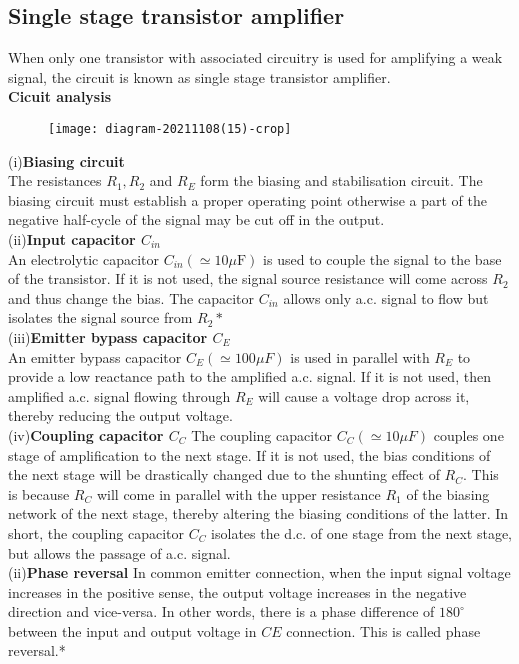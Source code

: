 \subsection{Single stage transistor amplifier}
When only one transistor with associated circuitry is used for amplifying a weak signal, the circuit is known as single stage transistor amplifier.\\
\textbf{Cicuit analysis}\\
\begin{figure}[H]
	\centering
	\texttt{[image: diagram-20211108(15)-crop]}
	\caption{}
	\label{}
\end{figure}
(i)\textbf{Biasing circuit}\\
The resistances $R_{1}, R_{2}$ and $R_{E}$ form the biasing and stabilisation circuit. The biasing circuit must establish a proper operating point otherwise a part of the negative half-cycle of the signal may be cut off in the output.\\
(ii)\textbf{Input capacitor $C_{in}$}\\
An electrolytic capacitor $C_{i n}(\simeq 10 \mu \mathrm{F})$ is used to couple the signal to the base of the transistor. If it is not used, the signal source resistance will come across $R_{2}$ and thus change the bias. The capacitor $C_{i n}$ allows only a.c. signal to flow but isolates the signal source from $R_{2} *$\\
(iii)\textbf{Emitter bypass capacitor $C_E$}\\
An emitter bypass capacitor $C_{E}(\simeq 100 \mu F)$ is used in parallel with $R_{E}$ to provide a low reactance path to the amplified a.c. signal. If it is not used, then amplified a.c. signal flowing through $R_{E}$ will cause a voltage drop across it, thereby reducing the output voltage.\\
(iv)\textbf{Coupling capacitor $C_C$}
The coupling capacitor $C_{C}(\simeq 10 \mu F)$  couples one stage of amplification to the next stage. If it is not used, the bias conditions of the next stage will be drastically changed due to the shunting effect of $R_{C} .$ This is because $R_{C}$ will come in parallel with the upper resistance $R_{1}$ of the biasing network of the next stage, thereby altering the biasing conditions of the latter. In short, the coupling capacitor $C_{C}$ isolates the d.c. of one stage from the next stage, but allows the passage of a.c. signal.\\
(ii)\textbf{Phase reversal}
In common emitter connection, when the input signal voltage increases in the positive sense, the output voltage increases in the negative direction and vice-versa. In other words, there is a phase difference of $180^{\circ}$ between the input and output voltage in $C E$ connection. This is called phase reversal.*

